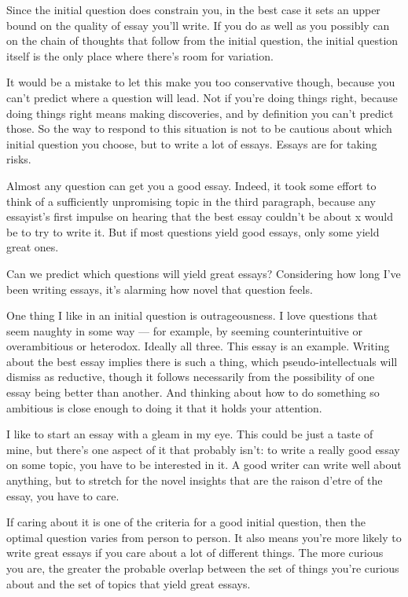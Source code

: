 Since the initial question does constrain you, in the best case it sets
an upper bound on the quality of essay you'll write. If you do as well
as you possibly can on the chain of thoughts that follow from the
initial question, the initial question itself is the only place where
there's room for variation.

It would be a mistake to let this make you too conservative though,
because you can't predict where a question will lead. Not if you're
doing things right, because doing things right means making discoveries,
and by definition you can't predict those. So the way to respond to this
situation is not to be cautious about which initial question you choose,
but to write a lot of essays. Essays are for taking risks.

Almost any question can get you a good essay. Indeed, it took some
effort to think of a sufficiently unpromising topic in the third
paragraph, because any essayist's first impulse on hearing that the best
essay couldn't be about x would be to try to write it. But if most
questions yield good essays, only some yield great ones.

Can we predict which questions will yield great essays? Considering how
long I've been writing essays, it's alarming how novel that question
feels.

One thing I like in an initial question is outrageousness. I love
questions that seem naughty in some way --- for example, by seeming
counterintuitive or overambitious or heterodox. Ideally all three. This
essay is an example. Writing about the best essay implies there is such
a thing, which pseudo-intellectuals will dismiss as reductive, though it
follows necessarily from the possibility of one essay being better than
another. And thinking about how to do something so ambitious is close
enough to doing it that it holds your attention.

I like to start an essay with a gleam in my eye. This could be just a
taste of mine, but there's one aspect of it that probably isn't: to
write a really good essay on some topic, you have to be interested in
it. A good writer can write well about anything, but to stretch for the
novel insights that are the raison d'etre of the essay, you have to
care.

If caring about it is one of the criteria for a good initial question,
then the optimal question varies from person to person. It also means
you're more likely to write great essays if you care about a lot of
different things. The more curious you are, the greater the probable
overlap between the set of things you're curious about and the set of
topics that yield great essays.

